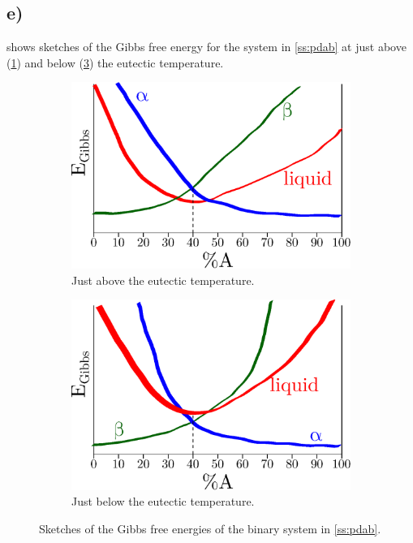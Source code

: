\documentclass[a4paper]{article}
\begin{document}
	\subsection{e)}
	 shows sketches of the Gibbs free energy for the system in \cref{ss:pdab} at just above (\cref{sf:abht}) and below (\cref{sf:ablt}) the eutectic temperature.
	\begin{figure}
		\centering
		\begin{subfigure}[b]{\linewidth}
			\centering
			\includegraphics[width=\linewidth]{abht.eps}
			\caption{Just above the eutectic temperature.}
			\label{sf:abht}
		\end{subfigure}
		
		\begin{subfigure}[b]{\linewidth}
			\centering
			\includegraphics[width=\linewidth]{ablt.eps}
			\caption{Just below the eutectic temperature.}
			\label{sf:ablt}
		\end{subfigure}
		\caption{Sketches of the Gibbs free energies of the binary system in \cref{ss:pdab}.}
	\end{figure}
\end{document}
